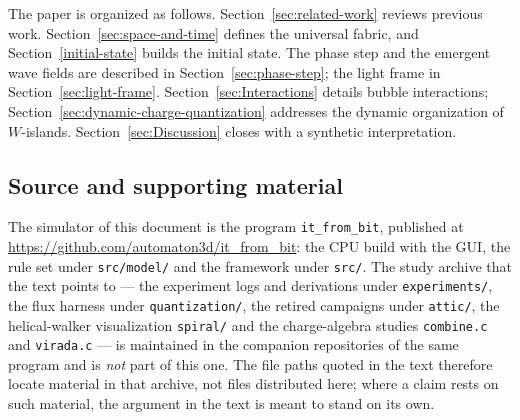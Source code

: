 \documentclass[a4paper]{article}
\begin{document}
The paper is organized as follows. Section~\ref{sec:related-work} reviews previous work. Section~\ref{sec:space-and-time} defines the universal fabric, and Section~\ref{initial-state} builds the initial state. The phase step and the emergent wave fields are described in Section~\ref{sec:phase-step}; the light frame in Section~\ref{sec:light-frame}. Section~\ref{sec:Interactions} details bubble interactions; Section~\ref{sec:dynamic-charge-quantization} addresses the dynamic organization of $W$-islands. Section~\ref{sec:Discussion} closes with a synthetic interpretation.

\subsection*{Source and supporting material}
The simulator of this document is the program \texttt{it\_from\_bit}, published at
\url{https://github.com/automaton3d/it_from_bit}: the CPU build with the GUI, the rule set under
\texttt{src/model/} and the framework under \texttt{src/}.  The study archive that the text points to
--- the experiment logs and derivations under \texttt{experiments/}, the flux harness under
\texttt{quantization/}, the retired campaigns under \texttt{attic/}, the helical-walker visualization
\texttt{spiral/} and the charge-algebra studies \texttt{combine.c} and \texttt{virada.c} --- is
maintained in the companion repositories of the same program and is \emph{not} part of this one.
The file paths quoted in the text therefore locate material in that archive, not files distributed
here; where a claim rests on such material, the argument in the text is meant to stand on its own.
\end{document}
